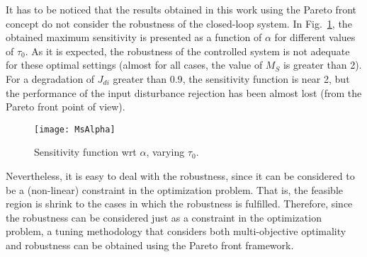 It has to be noticed that the results obtained in this work using the Pareto front concept do not consider the robustness of the closed-loop system. In Fig.~\ref{fig:MsAlpha}, the obtained maximum sensitivity is presented as a function of $\alpha$ for different values of $\tau_0$. As it is expected, the robustness of the controlled system is not adequate for these optimal settings (almost for all cases, the value of $M_S$ is greater than 2). For a degradation of $J_{di}$ greater than $0.9$, the sensitivity function is near 2, but the performance of the input disturbance rejection has been almost lost (from the Pareto front point of view).
\begin{figure}%
	\centering
	\texttt{[image: MsAlpha]}%
	\caption{Sensitivity function wrt $\alpha$, varying $\tau_0$.}%
	\label{fig:MsAlpha}%
\end{figure}
%
Nevertheless, it is easy to deal with the robustness, since it can be considered to be a (non-linear) constraint in the optimization problem. That is, the feasible region is shrink to the cases in which the robustness is fulfilled.
%
%
Therefore, since the robustness can be considered just as a constraint in the optimization problem, a tuning methodology that considers both multi-objective optimality and robustness can be obtained using the Pareto front framework.
%
%

